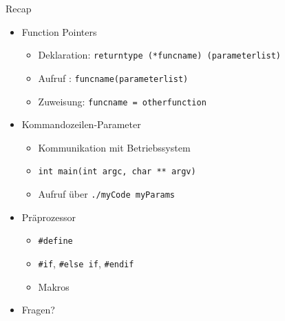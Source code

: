 
\begin{frame}[t,plain]
\titlepage
\end{frame}


\begin{frame}[fragile]{Recap}
%
\begin{itemize}
\item Function Pointers
	\begin{itemize}
	\item Deklaration:	\tabto{4cm}	\texttt{returntype (*funcname) (parameterlist)}
	\item Aufruf	:		\tabto{4cm}	\texttt{funcname(parameterlist)}
	\item Zuweisung:		\tabto{4cm}	\texttt{funcname = otherfunction}
	\end{itemize}
\item Kommandozeilen-Parameter
	\begin{itemize}
	\item Kommunikation mit Betriebssystem
	\item \texttt{int main(int argc, char ** argv)}
	\item Aufruf über \texttt{./myCode myParams}
	\end{itemize}
\item Präprozessor
	\begin{itemize}
	\item \texttt{#define}
	\item \texttt{#if}, \texttt{#else if}, \texttt{#endif}
	\item Makros
	\end{itemize}
\item Fragen?
\end{itemize}
%
\end{frame}


